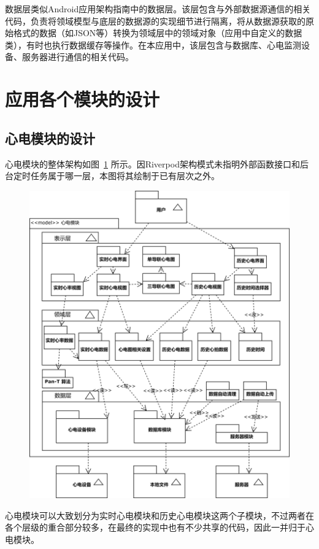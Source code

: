 数据层类似Android应用架构指南中的数据层。该层包含与外部数据源通信的相关代码，负责将领域模型与底层的数据源的实现细节进行隔离，将从数据源获取的原始格式的数据（如JSON等）转换为领域层中的领域对象（应用中自定义的数据类），有时也执行数据缓存等操作。在本应用中，该层包含与数据库、心电监测设备、服务器进行通信的相关代码。


\section{应用各个模块的设计}\label{sec:app-design}

\subsection{心电模块的设计}\label{subsec:ecg-design}

心电模块的整体架构如图~\ref{fig:model-ecg} 所示。因Riverpod架构模式未指明外部函数接口和后台定时任务属于哪一层，本图将其绘制于已有层次之外。

\begin{figure}[!ht]
    \centering
    \includegraphics[width=.8\textwidth]{../assets/model-ecg.drawio}
    \label{fig:model-ecg}
\end{figure}

心电模块可以大致划分为实时心电模块和历史心电模块这两个子模块，不过两者在各个层级的重合部分较多，在最终的实现中也有不少共享的代码，因此一并归于心电模块。

